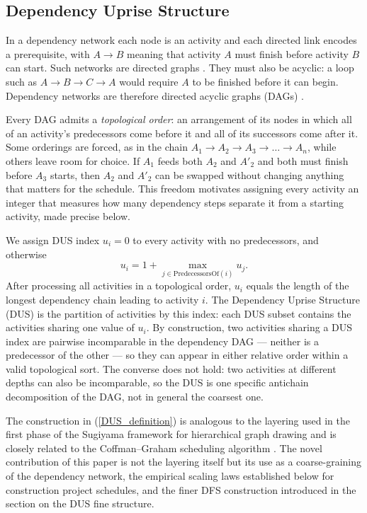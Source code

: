 \documentclass[11pt,a4paper]{article}
\begin{document}
\subsection*{Dependency Uprise Structure}

In a dependency network each node is an activity and each directed link encodes a prerequisite, with $A \to B$ meaning that activity $A$ must finish before activity $B$ can start. Such networks are directed graphs \cite{gross2005graph}. They must also be acyclic: a loop such as $A \to B \to C \to A$ would require $A$ to be finished before it can begin. Dependency networks are therefore directed acyclic graphs (DAGs) \cite{gross2005graph}.

Every DAG admits a {\em topological order}: an arrangement of its nodes in which all of an activity's predecessors come before it and all of its successors come after it. Some orderings are forced, as in the chain $A_{1} \to A_{2} \to A_{3} \to \dots \to A_{n}$, while others leave room for choice. If $A_{1}$ feeds both $A_{2}$ and $A'_{2}$ and both must finish before $A_{3}$ starts, then $A_{2}$ and $A'_{2}$ can be swapped without changing anything that matters for the schedule. This freedom motivates assigning every activity an integer that measures how many dependency steps separate it from a starting activity, made precise below.

We assign DUS index $u_i = 0$ to every activity with no predecessors, and otherwise
%
\begin{equation}
u_i = 1 + \max_{j\in \text{PredecessorsOf}(i)} u_j.
\label{DUS_definition}
\end{equation}
%
After processing all activities in a topological order, $u_i$ equals the length of the longest dependency chain leading to activity $i$. The Dependency Uprise Structure (DUS) is the partition of activities by this index: each DUS subset contains the activities sharing one value of $u_i$. By construction, two activities sharing a DUS index are pairwise incomparable in the dependency DAG --- neither is a predecessor of the other --- so they can appear in either relative order within a valid topological sort. The converse does not hold: two activities at different depths can also be incomparable, so the DUS is one specific antichain decomposition of the DAG, not in general the coarsest one.

The construction in (\ref{DUS_definition}) is analogous to the layering used in the first phase of the Sugiyama framework for hierarchical graph drawing \cite{sugiyama1981} and is closely related to the Coffman--Graham scheduling algorithm \cite{coffmangraham1972}. The novel contribution of this paper is not the layering itself but its use as a coarse-graining of the dependency network, the empirical scaling laws established below for construction project schedules, and the finer DFS construction introduced in the section on the DUS fine structure.
\end{document}
